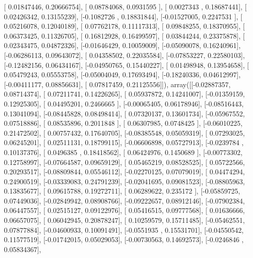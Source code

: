 \documentclass{article}
\begin{document}
       [ 0.01847446,  0.20666754],
       [ 0.08784068,  0.0931595 ],
       [ 0.0027343 ,  0.18687441],
       [ 0.02426342,  0.13155239],
       [-0.1082726 ,  0.18831844],
       [-0.01527005,  0.2247531 ],
       [ 0.05216078,  0.12040189],
       [ 0.07762178,  0.11117313],
       [ 0.09848255,  0.18370955],
       [ 0.06373425,  0.11326705],
       [ 0.16812928,  0.16499597],
       [ 0.03844244,  0.23375878],
       [ 0.02343475,  0.04872326],
       [-0.01646429,  0.10059009],
       [-0.05090078,  0.16240961],
       [-0.06286113,  0.09643072],
       [ 0.04358502,  0.22035584],
       [-0.07853227,  0.22580103],
       [-0.12482156,  0.06434167],
       [-0.04950765,  0.15440227],
       [ 0.01498948,  0.13954658],
       [ 0.05479243,  0.05553758],
       [-0.05004049,  0.17693494],
       [-0.18240336,  0.04612997],
       [-0.00411177,  0.08856631],
       [ 0.07817459,  0.21125556]]), array([[-0.02887357,  0.08714374],
       [ 0.07211741,  0.14226265],
       [ 0.05937872,  0.14241007],
       [-0.01359159,  0.12925305],
       [ 0.04495201,  0.2466665 ],
       [-0.00065405,  0.06178946],
       [-0.08516443,  0.13041094],
       [-0.08445828,  0.08498414],
       [ 0.07320137,  0.13601734],
       [-0.05967552,  0.07518886],
       [ 0.08535896,  0.2011848 ],
       [ 0.06307985,  0.0748425 ],
       [-0.06010225,  0.21472502],
       [ 0.00757432,  0.17640705],
       [-0.08385548,  0.05059319],
       [ 0.07293025,  0.06245201],
       [ 0.02511131,  0.18799115],
       [-0.06606898,  0.05727913],
       [-0.0239784 ,  0.10137376],
       [ 0.0496385 ,  0.18418562],
       [ 0.06424976,  0.1450689 ],
       [-0.00773302,  0.12758997],
       [-0.07664587,  0.09659129],
       [ 0.05465219,  0.08528525],
       [ 0.05722566,  0.20293517],
       [-0.08809844,  0.05546112],
       [-0.02270125,  0.07079019],
       [ 0.04474294,  0.24900519],
       [-0.03339083,  0.24791239],
       [-0.02041695,  0.09081523],
       [-0.08805963,  0.13835677],
       [ 0.09615788,  0.19272711],
       [ 0.06289622,  0.235172  ],
       [-0.05859725,  0.07449036],
       [-0.02849942,  0.08908766],
       [-0.09222657,  0.08912146],
       [-0.07902384,  0.06447557],
       [ 0.02515127,  0.09122976],
       [ 0.05416515,  0.09777568],
       [ 0.01636666,  0.06657075],
       [ 0.06042945,  0.20878247],
       [ 0.10259579,  0.15711485],
       [-0.05462551,  0.07877884],
       [-0.04600933,  0.10091491],
       [-0.0551935 ,  0.15531701],
       [-0.04550542,  0.11577519],
       [-0.01742015,  0.05029053],
       [-0.00730563,  0.14692573],
       [-0.0246846 ,  0.05834367],
\end{document}
